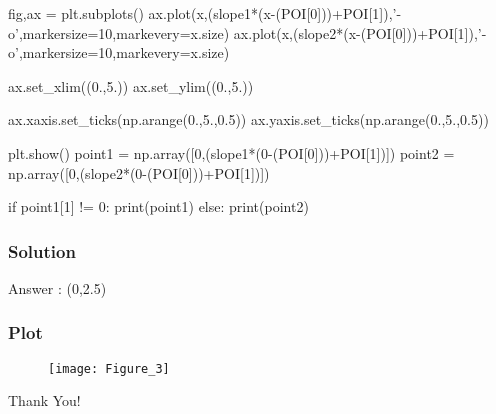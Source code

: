 \documentclass{beamer}
\begin{document}
\begin{frame}[fragile]
\begin{semiverbatim}
fig,ax = plt.subplots()
ax.plot(x,(slope1*(x-(POI[0]))+POI[1]),'-o',markersize=10,markevery=x.size)
ax.plot(x,(slope2*(x-(POI[0]))+POI[1]),'-o',markersize=10,markevery=x.size)

ax.set_xlim((0.,5.))
ax.set_ylim((0.,5.))

ax.xaxis.set_ticks(np.arange(0.,5.,0.5))
ax.yaxis.set_ticks(np.arange(0.,5.,0.5))

plt.show()
point1 = np.array([0,(slope1*(0-(POI[0]))+POI[1])])
point2 = np.array([0,(slope2*(0-(POI[0]))+POI[1])])



\end{semiverbatim}
\end{frame}

\begin{frame}[fragile]
\begin{semiverbatim}

if point1[1] != 0:
\linebreak \tab \tab	print(point1)
else:
\linebreak \tab \tab	print(point2)
	

\end{semiverbatim}
\end{frame}


\begin{frame}
\frametitle{Solution}
Answer : (0,2.5)
\end{frame}

\begin{frame}
\frametitle{Plot}
\begin{figure}
\texttt{[image: Figure\_3]}
\end{figure}
\end{frame}


\begin{frame}
Thank You!
\end{frame}
\end{document}
